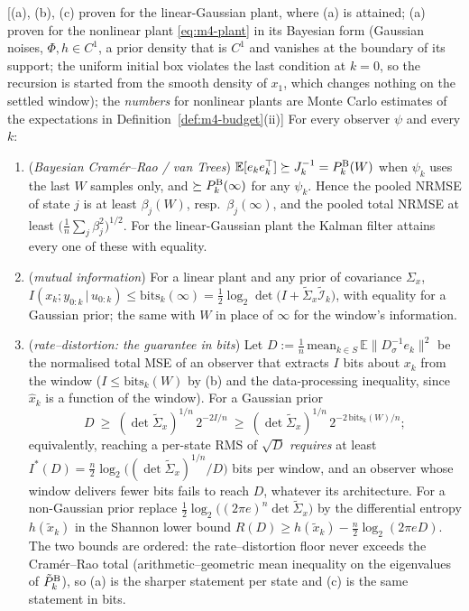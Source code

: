 \begin{theorem}\label{thm:m4-bounds}
[(a), (b), (c) proven for the linear-Gaussian plant, where (a) is attained; (a) proven for the nonlinear plant
\eqref{eq:m4-plant} in its Bayesian form (Gaussian noises, $\Phi,h\in C^1$, a prior density that is $C^1$ and
vanishes at the boundary of its support; the uniform initial box violates the last condition at $k=0$, so the
recursion is started from the smooth density of $x_1$, which changes nothing on the settled window); the
\emph{numbers} for nonlinear plants are Monte Carlo estimates of the expectations in Definition~\ref{def:m4-budget}(ii)]
For every observer $\psi$ and every $k$:
\begin{enumerate}
\item[(a)] (\emph{Bayesian Cram\'er--Rao / van Trees}) $\mathbb E[e_ke_k^\top]\succeq J_k^{-1}=P^{\rm B}_k(W)$ when
$\psi_k$ uses the last $W$ samples only, and $\succeq P^{\rm B}_k(\infty)$ for any $\psi_k$. Hence the pooled
NRMSE of state $j$ is at least $\beta_j(W)$, resp.\ $\beta_j(\infty)$, and the pooled total NRMSE at least
$\big(\tfrac1n\sum_j\beta_j^2\big)^{1/2}$. For the linear-Gaussian plant the Kalman filter attains every one of
these with equality.
\item[(b)] (\emph{mutual information}) For a linear plant and any prior of covariance $\Sigma_x$,
$I(x_k;y_{0:k}\,|\,u_{0:k})\le\mathrm{bits}_k(\infty)=\tfrac12\log_2\det\big(I+\tilde\Sigma_x\tilde{\mathcal I}_k\big)$,
with equality for a Gaussian prior; the same with $W$ in place of $\infty$ for the window's information.
\item[(c)] (\emph{rate--distortion: the guarantee in bits}) Let $D:=\tfrac1n\,\mathrm{mean}_{k\in S}\,\mathbb E\|D_\sigma^{-1}e_k\|^2$
be the normalised total MSE of an observer that extracts $I$ bits about $x_k$ from the window
($I\le\mathrm{bits}_k(W)$ by (b) and the data-processing inequality, since $\hat x_k$ is a function of the window).
For a Gaussian prior
\[
D\ \ge\ (\det\tilde\Sigma_x)^{1/n}\,2^{-2I/n}\ \ge\ (\det\tilde\Sigma_x)^{1/n}\,2^{-2\,\mathrm{bits}_k(W)/n};
\]
equivalently, reaching a per-state RMS of $\sqrt D$ \emph{requires} at least
$I^*(D)=\tfrac n2\log_2\big((\det\tilde\Sigma_x)^{1/n}/D\big)$ bits per window, and an observer whose window
delivers fewer bits fails to reach $D$, whatever its architecture. For a non-Gaussian prior replace
$\tfrac12\log_2\big((2\pi e)^n\det\tilde\Sigma_x\big)$ by the differential entropy $h(\tilde x_k)$ in the Shannon
lower bound $R(D)\ge h(\tilde x_k)-\tfrac n2\log_2(2\pi eD)$. The two bounds are ordered: the rate--distortion
floor never exceeds the Cram\'er--Rao total (arithmetic--geometric mean inequality on the eigenvalues of
$\tilde P^{\rm B}_k$), so (a) is the sharper statement per state and (c) is the same statement in bits.
\end{enumerate}
\end{theorem}
